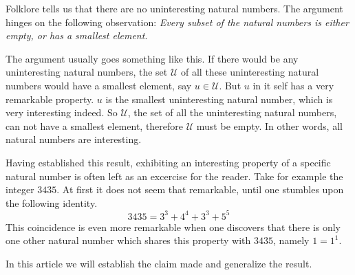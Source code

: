 Folklore tells us that there are no uninteresting natural numbers. The argument
hinges on the following observation: \emph{Every subset of the natural numbers
is either empty, or has a smallest element}.

The argument usually goes something like this. If there would be any 
uninteresting natural numbers, the set $\mathcal{U}$ of all these uninteresting
natural numbers would have a smallest element, say $u \in \mathcal{U}$. 
But $u$ in it self has a very remarkable property. $u$ is the smallest 
uninteresting natural number, which is very interesting indeed. So 
$\mathcal{U}$, the set of all the uninteresting natural numbers, can not have a
smallest element, therefore $\mathcal{U}$ must be empty. In other words, all 
natural numbers are interesting.

Having established this result, exhibiting an interesting property of a specific
natural number is often left as an excercise for the reader. Take for example 
the integer $3435$. At first it does not seem that remarkable, until one 
stumbles upon the following identity.
\[
	3435 = 3^{3} + 4^{4} + 3^{3} + 5^{5}
\]
This coincidence is even more remarkable when one discovers that there is only 
one other natural number which shares this property with $3435$, namely
$1 = 1^{1}$.

In this article we will establish the claim made and generalize the result.
